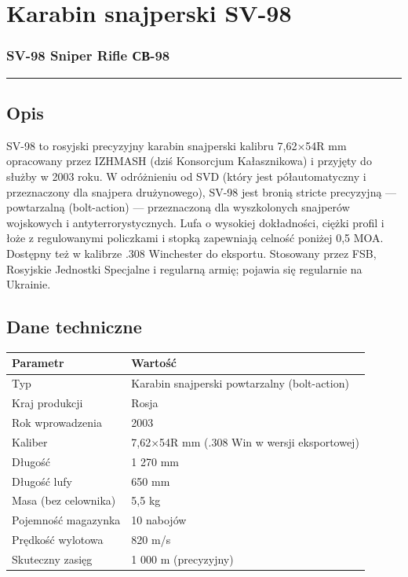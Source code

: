 \documentclass[12pt,openany,oneside]{book}
\begin{document}
\chapter{Karabin snajperski SV-98}\label{karabin-snajperski-sv-98}

\subsection{SV-98 Sniper Rifle \textbar{}
СВ-98}\label{sv-98-sniper-rifle-ux441ux432-98}

\begin{center}\rule{0.5\linewidth}{0.5pt}\end{center}

\section{Opis}\label{opis-63}

SV-98 to rosyjski precyzyjny karabin snajperski kalibru 7,62×54R mm
opracowany przez IZHMASH (dziś Konsorcjum Kałasznikowa) i przyjęty do
służby w 2003 roku. W odróżnieniu od SVD (który jest półautomatyczny i
przeznaczony dla snajpera drużynowego), SV-98 jest bronią stricte
precyzyjną --- powtarzalną (bolt-action) --- przeznaczoną dla
wyszkolonych snajperów wojskowych i antyterrorystycznych. Lufa o
wysokiej dokładności, ciężki profil i łoże z regulowanymi policzkami i
stopką zapewniają celność poniżej 0,5 MOA. Dostępny też w kalibrze .308
Winchester do eksportu. Stosowany przez FSB, Rosyjskie Jednostki
Specjalne i regularną armię; pojawia się regularnie na Ukrainie.

\section{Dane techniczne}\label{dane-techniczne-63}

\begin{longtable}[]{@{}ll@{}}
\toprule\noalign{}
Parametr & Wartość \\
\midrule\noalign{}
\endhead
\bottomrule\noalign{}
\endlastfoot
Typ & Karabin snajperski powtarzalny (bolt-action) \\
Kraj produkcji & Rosja \\
Rok wprowadzenia & 2003 \\
Kaliber & 7,62×54R mm (.308 Win w wersji eksportowej) \\
Długość & 1 270 mm \\
Długość lufy & 650 mm \\
Masa (bez celownika) & 5,5 kg \\
Pojemność magazynka & 10 nabojów \\
Prędkość wylotowa & 820 m/s \\
Skuteczny zasięg & 1 000 m (precyzyjny) \\
\end{longtable}
\end{document}
